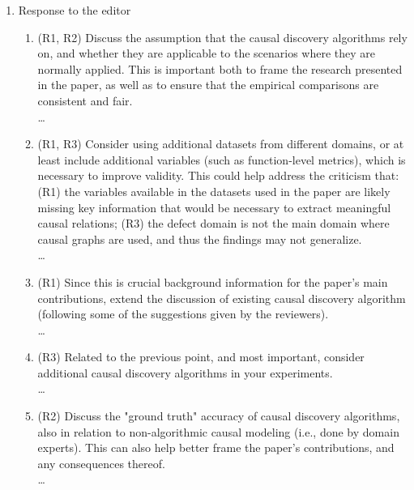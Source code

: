 \documentclass[]{svjour3}
\begin{document}
\begin{enumerate}
\begin{enumerate}
    \end{enumerate}
    \item Response to the editor
    \begin{enumerate}
        \item (R1, R2) Discuss the assumption that the causal discovery algorithms rely on, and whether they are applicable to the scenarios where they are normally applied. This is important both to frame the research presented in the paper, as well as to ensure that the empirical comparisons are consistent and fair.\\{\MARK \dots}
        \item (R1, R3) Consider using additional datasets from different domains, or at least include additional variables (such as function-level metrics), which is necessary to improve validity. This could help address the criticism that: (R1) the variables available in the datasets used in the paper are likely missing key information that would be necessary to extract meaningful causal relations; (R3) the defect domain is not the main domain where causal graphs are used, and thus the findings may not generalize.\\{\MARK \dots}
        \item (R1) Since this is crucial background information for the paper's main contributions, extend the discussion of existing causal discovery algorithm (following some of the suggestions given by the reviewers).\\{\MARK \dots}
        \item (R3) Related to the previous point, and most important, consider additional causal discovery algorithms in your experiments.\\{\MARK \dots}
        \item (R2) Discuss the "ground truth" accuracy of causal discovery algorithms, also in relation to non-algorithmic causal modeling (i.e., done by domain experts). This can also help better frame the paper's contributions, and any consequences thereof.\\{\MARK \dots}
    \end{enumerate}
\end{enumerate}
\end{document}
